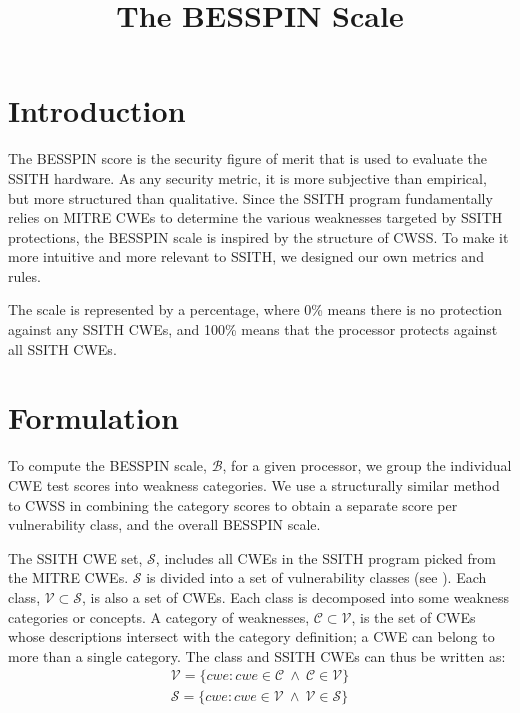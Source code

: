 \documentclass{article}
\title{The BESSPIN Scale}
\date{\vspace{-0.5cm}}
\begin{document}
\maketitle

\section{Introduction}

The BESSPIN score is the security figure of merit that is used to evaluate the SSITH hardware. As any security metric, it is more subjective than empirical, but more structured than qualitative. Since the SSITH program fundamentally relies on MITRE CWEs to determine the various weaknesses targeted by SSITH protections, the BESSPIN scale is inspired by the structure of CWSS. To make it more intuitive and more relevant to SSITH, we designed our own metrics and rules.

The scale is represented by a percentage, where 0\% means there is no protection against any SSITH CWEs, and 100\% means that the processor protects against all SSITH CWEs. 

\section{Formulation}

To compute the BESSPIN scale, $\mathcal{B}$, for a given processor, we group the individual CWE test scores into weakness categories. We use a structurally similar method to CWSS in combining the category scores to obtain a separate score per vulnerability class, and the overall BESSPIN scale.

The SSITH CWE set, $\mathcal{S}$, includes all CWEs in the SSITH program picked from the MITRE CWEs. $\mathcal{S}$ is divided into a set of vulnerability classes (see ). Each class, $\mathcal{V} \subset \mathcal{S}$, is also a set of CWEs. Each class is decomposed into some weakness categories or concepts. A category of weaknesses, $\mathcal{C} \subset \mathcal{V}$, is the set of CWEs whose descriptions intersect with the category definition; a CWE can belong to more than a single category. The class and SSITH CWEs can thus be written as:
\begin{equation}
    \begin{array}{c}
        \mathcal{V} = \{ cwe : cwe \in \mathcal{C} \ \wedge \ \mathcal{C} \in \mathcal{V} \} \\
        \mathcal{S} = \{ cwe : cwe \in \mathcal{V} \ \wedge \ \mathcal{V} \in \mathcal{S} \} 
    \end{array}
\end{equation}
\end{document}
